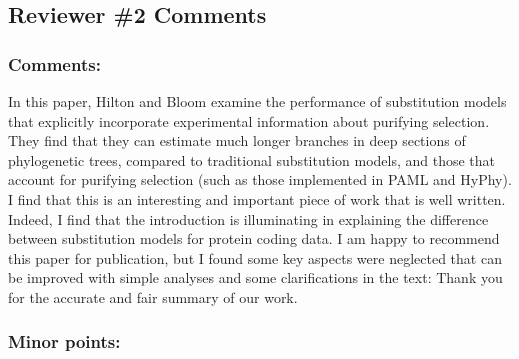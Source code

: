 \documentclass[11pt, oneside]{article}   	%
\newcommand{\response}[1]{{\color{black}#1}}
\begin{document}
\subsection*{Reviewer \#2 Comments} 

\subsubsection*{Comments:} 
In this paper, Hilton and Bloom examine the performance of substitution models that explicitly incorporate experimental information about purifying selection. 
They find that they can estimate much longer branches in deep sections of phylogenetic trees, compared to traditional substitution models, and those that account for purifying selection (such as those implemented in PAML and HyPhy). 
I find that this is an interesting and important piece of work that is well written. 
Indeed, I find that the introduction is illuminating in explaining the difference between substitution models for protein coding data. 
I am happy to recommend this paper for publication, but I found some key aspects were neglected that can be improved with simple analyses and some clarifications in the text: 
\response{Thank you for the accurate and fair summary of our work.}

\subsubsection*{Minor points:} 
\end{document}
